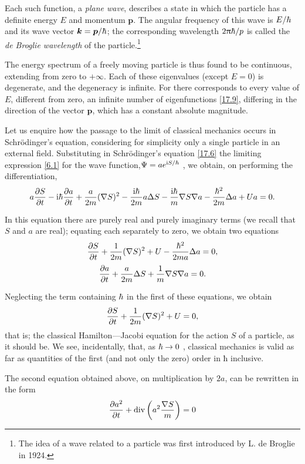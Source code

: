Each such function, a \textit{plane wave}, describes a state in which the particle has a definite energy $ E $ and momentum $ \bm{p} $. The angular frequency of this wave is $ E/\hbar $ and its wave vector $ \bm{k}=\bm{p}/\hbar $; the corresponding wavelength $ 2\uppi\hbar/p $ is called the \textit{de Broglie wavelength} of the particle.\footnote{The idea of a wave related to a particle was first introduced by L. de Broglie in 1924.}

The energy spectrum of a freely moving particle is thus found to be continuous, extending from zero to $+\infty$. Each of these eigenvalues (except $ E = 0 $) is degenerate, and the degeneracy is infinite. For there corresponds to every value of $ E $, different from zero, an infinite number of eigenfunctions \eqref{17.9}, differing in the direction of the vector $ \bm{p} $, which has a constant absolute magnitude.

Let us enquire how the passage to the limit of classical mechanics occurs in Schrödinger’s equation, considering for simplicity only a single particle in an external field. Substituting in Schrödinger’s equation \eqref{17.6} the limiting expression \eqref{6.1} for the wave function,$ \Psi=ae^{\mathrm{i} S/\hbar} $ , we obtain, on performing the differentiation,
\[ a\frac{\partial S}{\partial t}-\mathrm{i}\hbar\frac{\partial a}{\partial t}+\frac{a}{2m}(\nabla S)^2-\frac{\mathrm{i}\hbar}{2m}a\Delta S-\frac{\mathrm{i}\hbar}{m}\nabla S\nabla a-\frac{\hbar^2}{2m}\Delta a+Ua=0. \]



In this equation there are purely real and purely imaginary terms (we recall that $ S $ and $ a $ are real); equating each separately to zero, we obtain two equations
\[ \frac{\partial S}{\partial t}+\frac{1}{2m}(\nabla S)^2+U-\frac{\hbar^2}{2ma}\Delta a=0, \]
\[ \frac{\partial a}{\partial t}+\frac{a}{2m}\Delta S+\frac{1}{m}\nabla S\nabla a=0. \]



Neglecting the term containing $\hbar$ in the first of these equations, we obtain
\begin{equation}\label{17.10}
\frac{\partial S}{\partial t}+\frac{1}{2m}(\nabla S)^2+U=0,
\end{equation}
that is; the classical Hamilton—Jacobi equation for the action $ S $ of a particle, as it should be. We see, incidentally, that, as $\hbar\rightarrow0  $ , classical mechanics is valid as far as quantities of the first (and not only the zero) order in ħ inclusive.

The second equation obtained above, on multiplication by $ 2a $, can be rewritten in the form
\begin{equation}\label{17.11}
\frac{\partial a^2}{\partial t}+\mathrm{div}\left( a^2\frac{\nabla S}{m}\right)=0
\end{equation}


